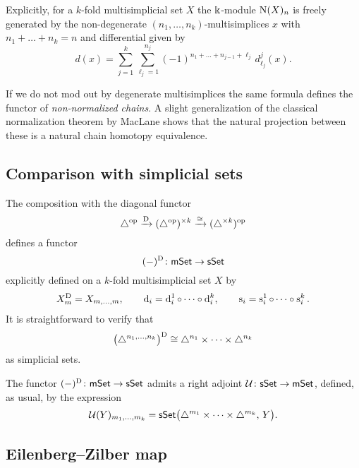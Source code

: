 Explicitly, for a $k$-fold multisimplicial set $X$ the $\Bbbk$-module $\operatorname{N}(X)_n$ is freely generated by the non-degenerate $(n_1, \dots, n_k)$-multisimplices $x$ with $n_1+\dots+n_k = n$ and differential given by
\[
d(x) = \sum_{j=1}^k \sum_{\ell_j=1}^{n_j}
(-1)^{n_{1}+\dots+n_{j-1}+\ell_j} \, d^j_{\ell_j}(x).
\]

\begin{remark*}
	If we do not mod out by degenerate multisimplices the same formula defines the functor of \textit{non-normalized chains}.
	A slight generalization of the classical normalization theorem by MacLane \cite{MacLane} shows that the natural projection between these is a natural chain homotopy equivalence.
\end{remark*}

\subsection{Comparison with simplicial sets} \label{ss:diagonal simplicial set}

The composition with the diagonal functor
\[
\triangle^{\mathrm{op}} \xrightarrow{\mathrm{D}}
(\triangle^{\mathrm{op}})^{\times k} \xrightarrow{\cong}
(\triangle^{\times k})^{\mathrm{op}}
\]
defines a functor
\[
(-)^{\mathrm{D}} \colon \mathsf{mSet} \to \mathsf{sSet}
\]
explicitly defined on a $k$-fold multisimplicial set $X$ by
\begin{gather*}
	X^{\mathrm{D}}_m = X_{m, \dots, m},
	\qquad
	\operatorname{d}_i = \operatorname{d}_i^1 \circ \dots \circ \operatorname{d}_i^k,
	\qquad
	\operatorname{s}_i = \operatorname{s}_i^1 \circ \dots \circ \operatorname{s}_i^k.
\end{gather*}
It is straightforward to verify that
\[
\big(\triangle^{n_1,\dots,n_k}\big)^{\mathrm{D}} \cong
\triangle^{n_1}\times\dots\times\triangle^{n_k}
\]
as simplicial sets.

The functor $(-)^{\mathrm{D}} \colon \mathsf{mSet} \to \mathsf{sSet}$ admits a right adjoint $\operatorname{\mathcal{U}} \colon \mathsf{sSet} \to \mathsf{mSet}$, defined, as usual, by the expression
\[
\operatorname{\mathcal{U}}(Y)_{m_1,\dots,m_k} =
\mathsf{sSet}\big( \triangle^{m_1} \times \dots \times \triangle^{m_k}, \, Y \big).
\]

\subsection{Eilenberg--Zilber map}

